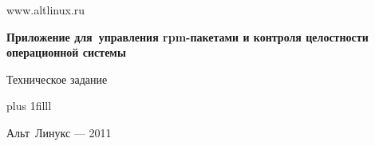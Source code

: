 
\Large
\thispagestyle{empty}
\begin{center}

www.altlinux.ru

\vspace{4cm}

{\LARGE \bf Приложение для~управления rpm-пакетами и контроля целостности\\
операционной системы}

\vspace{1.0cm}

Техническое задание

\end{center}

\vskip 0pt plus 1filll

\begin{center}
Альт~Линукс --- 2011
\end{center}

